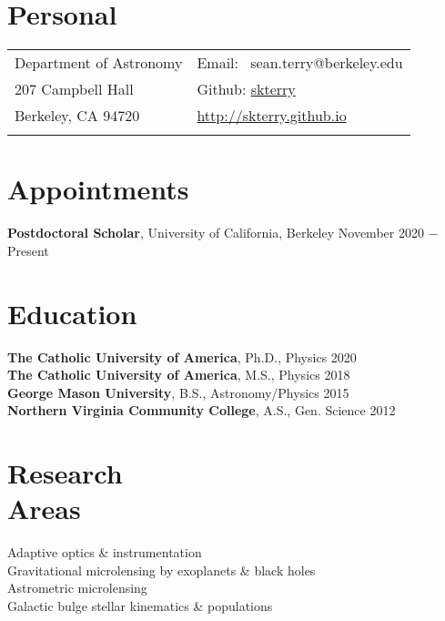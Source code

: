 \documentclass[margin,line]{cv}
\begin{document}

\begin{resume}
\section{\sc Personal}

\vspace{.05in}
\begin{tabular}{@{}p{3.5in}p{3in}}
Department of Astronomy      & Email: \,\,\,sean.terry@berkeley.edu \\
207 Campbell Hall       &  Github: \hyperlink{https://github.com/skterry}{skterry} \\
Berkeley, CA 94720       & \hyperlink{http://skterry.github.io}{http://skterry.github.io}\\
 \\
\end{tabular}

\section{\sc Appointments}
{\bf Postdoctoral Scholar}, University of California, Berkeley  \hfill      {November 2020 $-$ Present}\\


\section{\sc Education}
{\bf The Catholic University of America}, Ph.D., Physics  \hfill 2020\\
{\bf The Catholic University of America}, M.S., Physics  \hfill 2018\\
{\bf George Mason University}, B.S., Astronomy/Physics \hfill 2015\\
{\bf Northern Virginia Community College}, A.S., Gen. Science \hfill 2012\\

\section{\sc Research\\ Areas}
Adaptive optics \& instrumentation \\
Gravitational microlensing by exoplanets \& black holes  \\
Astrometric microlensing \\
Galactic bulge stellar kinematics \& populations  \\



\end{resume}
\end{document}
